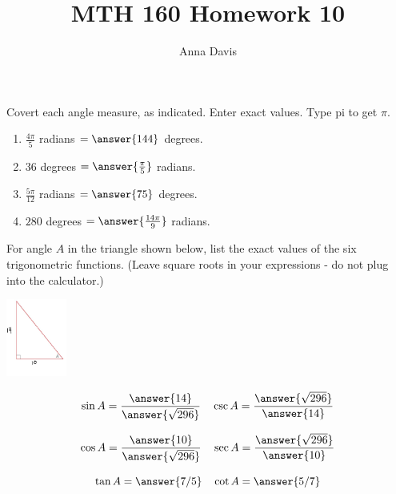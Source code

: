 \documentclass{ximera}
\author{Anna Davis} \title{MTH 160 Homework 10}
\begin{document}
\begin{abstract}

\end{abstract}
\maketitle

\begin{problem}\label{prob:160hom10prob1}
Covert each angle measure, as indicated.  Enter exact values.  Type pi to get $\pi$.
\begin{enumerate}
    \item $\frac{4\pi}{5}$ radians $=\answer{144}$ degrees.
    \item $36$ degrees $=\answer{\frac{\pi}{5}}$ radians.
    \item $\frac{5\pi}{12}$ radians $=\answer{75}$ degrees.
    \item $280$ degrees $=\answer{\frac{14\pi}{9}}$ radians.
\end{enumerate}
\end{problem}



\begin{problem}\label{prob:160hom10prob2}
For angle $A$ in the triangle shown below, list the exact values of the six trigonometric functions. (Leave square roots in your expressions - do not plug into the calculator.)
\begin{image}
   
\includegraphics[height=1in]{160H10pic5.jpg}~
 
\end{image}

$$\sin A=\frac{\answer{14}}{\answer{\sqrt{296}}}\quad \csc A=\frac{\answer{\sqrt{296}}}{\answer{14}}$$

$$\cos A=\frac{\answer{10}}{\answer{\sqrt{296}}}\quad \sec A=\frac{\answer{\sqrt{296}}}{\answer{10}}$$

$$\tan A=\answer{7/5}\quad \cot A=\answer{5/7}$$
\end{problem}
\end{document}
